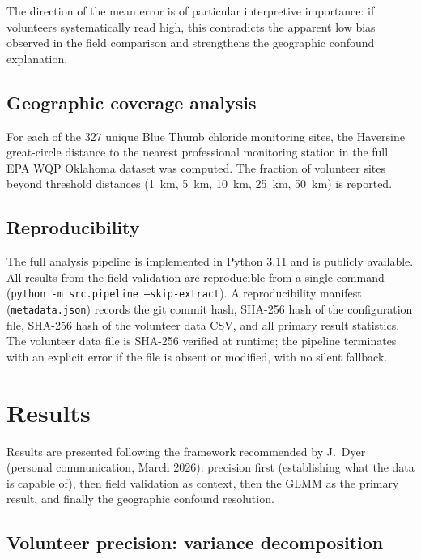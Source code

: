 \documentclass[lineno]{wlpeerj}
\begin{document}
The direction of the mean error is of particular interpretive importance: if volunteers systematically read high, this contradicts the apparent low bias observed in the field comparison and strengthens the geographic confound explanation.

\subsection{Geographic coverage analysis}
\label{sec:coveragemethod}

For each of the 327 unique Blue Thumb chloride monitoring sites, the Haversine great-circle distance to the nearest professional monitoring station in the full EPA WQP Oklahoma dataset was computed. The fraction of volunteer sites beyond threshold distances (1~km, 5~km, 10~km, 25~km, 50~km) is reported.

\subsection{Reproducibility}

The full analysis pipeline is implemented in Python 3.11 and is publicly available. All results from the field validation are reproducible from a single command (\texttt{python -m src.pipeline --skip-extract}). A reproducibility manifest (\texttt{metadata.json}) records the git commit hash, SHA-256 hash of the configuration file, SHA-256 hash of the volunteer data CSV, and all primary result statistics. The volunteer data file is SHA-256 verified at runtime; the pipeline terminates with an explicit error if the file is absent or modified, with no silent fallback.

\section{Results}

Results are presented following the framework recommended by J.\ Dyer (personal communication, March 2026): precision first (establishing what the data is capable of), then field validation as context, then the GLMM as the primary result, and finally the geographic confound resolution.

\subsection{Volunteer precision: variance decomposition}
\label{sec:precision}
\end{document}
